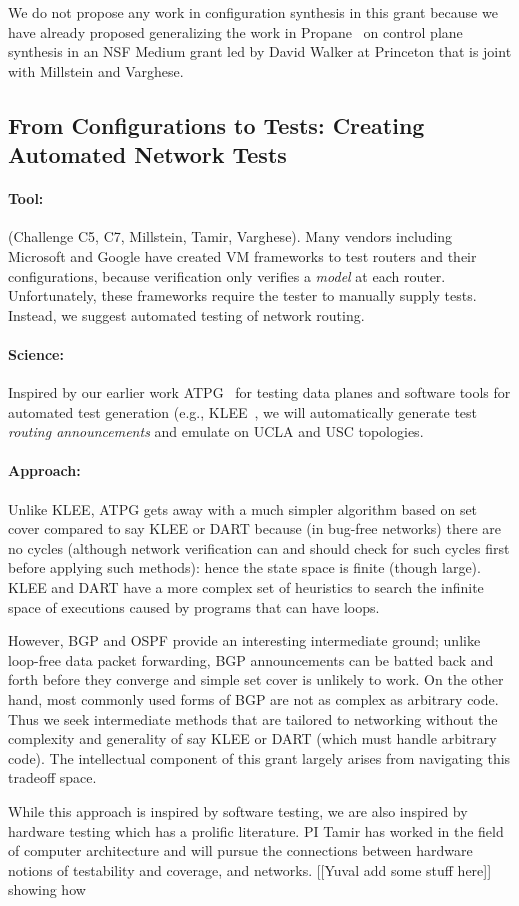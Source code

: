 We do not propose any work in configuration synthesis in this grant because we have already proposed generalizing the work in Propane~\cite{propane} on control plane synthesis in an NSF Medium grant led by David Walker at Princeton that is joint with Millstein and Varghese. 

\subsection{From Configurations to Tests: Creating Automated Network Tests}

\paragraph*{Tool:} (Challenge C5, C7, Millstein, Tamir, Varghese). Many vendors including Microsoft and 
Google have created VM frameworks to test routers and their configurations, because verification only verifies a {\em model} at  each router.  Unfortunately, these frameworks require
the tester to manually supply tests.  Instead, we suggest automated testing of network routing.

\paragraph*{Science:}  Inspired  by our earlier work ATPG~\cite{atpg} for testing data planes and software tools for automated test generation (e.g., KLEE~\cite{klee}, we will automatically generate test {\em routing announcements} and emulate on UCLA and USC topologies.

\paragraph*{Approach:}

Unlike KLEE, ATPG gets away with a much simpler algorithm based on set cover compared to say KLEE or DART because (in bug-free networks) there are no cycles (although network verification can and should check for such cycles first before applying such methods): hence the state space is finite (though large).   KLEE and DART have a more complex set of heuristics to search the infinite 
space of executions caused by programs that can have loops.   

However, BGP and OSPF provide
an interesting intermediate ground; unlike loop-free data packet forwarding, BGP announcements can be batted back and forth before they converge
and simple set cover is unlikely to work.   On the other hand, most commonly used forms of BGP are not as complex as arbitrary code.
Thus we seek intermediate methods that are tailored to networking without the complexity and generality of
say KLEE or DART (which must handle arbitrary code).   The intellectual component of this grant largely arises from navigating this tradeoff space.  

While this approach is inspired by software testing, we are also inspired by hardware testing which has a prolific literature.  PI Tamir has worked in the field of computer architecture and will pursue the connections between hardware notions of testability and coverage, and networks.  [[Yuval add some stuff here]]
showing how 


